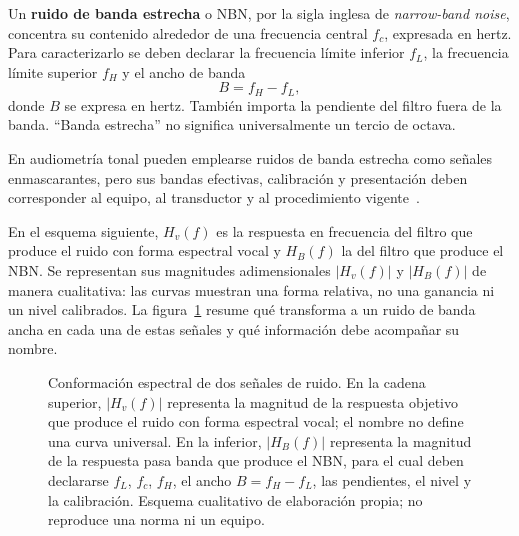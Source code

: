Un \textbf{ruido de banda estrecha} o NBN, por la sigla inglesa de
\emph{narrow-band noise}, concentra su contenido alrededor de una frecuencia
central \(f_c\), expresada en hertz. Para caracterizarlo se deben declarar la
frecuencia límite inferior \(f_L\), la frecuencia límite superior \(f_H\) y el
ancho de banda
\begin{equation}
    B=f_H-f_L,
    \label{eq:u10-ancho-nbn}
\end{equation}
donde \(B\) se expresa en hertz. También importa la pendiente del filtro fuera
de la banda. ``Banda estrecha'' no significa universalmente un tercio de
octava.

En audiometría tonal pueden emplearse ruidos de banda estrecha como
señales enmascarantes, pero sus bandas efectivas, calibración y presentación
deben corresponder al equipo, al transductor y al procedimiento vigente~\cite{iso389_4_1994,iec60645_1_2017}.

En el esquema siguiente, \(H_v(f)\) es la respuesta en frecuencia del filtro
que produce el ruido con forma espectral vocal y \(H_B(f)\) la del filtro que
produce el NBN. Se representan sus magnitudes adimensionales
\(\lvert H_v(f)\rvert\) y \(\lvert H_B(f)\rvert\) de manera cualitativa: las
curvas muestran una forma relativa, no una ganancia ni un nivel calibrados.
La figura~\ref{fig:u10-conformacion-espectral} resume qué transforma a un
ruido de banda ancha en cada una de estas señales y qué información debe
acompañar su nombre.

\begin{figure}[htbp]
    \centering
    
    \caption{Conformación espectral de dos señales de ruido.
    En la cadena superior, \(\lvert H_v(f)\rvert\) representa la magnitud de la
    respuesta objetivo que produce el ruido con forma espectral vocal; el
    nombre no define una curva universal. En la inferior,
    \(\lvert H_B(f)\rvert\) representa la magnitud de la respuesta pasa banda
    que produce el NBN, para el cual deben declararse \(f_L\), \(f_c\), \(f_H\),
    el ancho \(B=f_H-f_L\), las pendientes, el nivel y la calibración. Esquema
    cualitativo de elaboración propia; no reproduce una norma ni un equipo.}
    \label{fig:u10-conformacion-espectral}
\end{figure}

